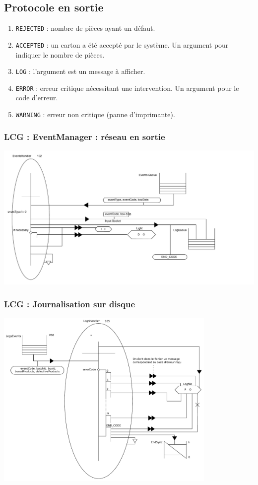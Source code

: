 \documentclass{beamer}
\begin{document}
	\subsection{Protocole en sortie}
	\begin{frame}
		\begin{enumerate}
			\item \texttt{REJECTED} : nombre de pièces ayant un défaut.
			\item \texttt{ACCEPTED} : un carton a été accepté par le système. Un argument pour indiquer le nombre de pièces.
			\item \texttt{LOG} : l'argument est un message à afficher.
			\item \texttt{ERROR} : erreur critique nécessitant une intervention. Un argument pour le code d'erreur.
			\item \texttt{WARNING} : erreur non critique (panne d'imprimante).
		\end{enumerate}
	\end{frame}

	\begin{frame}
	    \frametitle{LCG : EventManager : réseau en sortie}
	    \includegraphics[width=\textwidth]{../../SchemasLCG/src/EventsManager.pdf}
	\end{frame}

	\begin{frame}
	    \frametitle{LCG : Journalisation sur disque}
	    \includegraphics[width=0.8\textwidth]{../../SchemasLCG/LogsManager.pdf}
	\end{frame}
\end{document}
